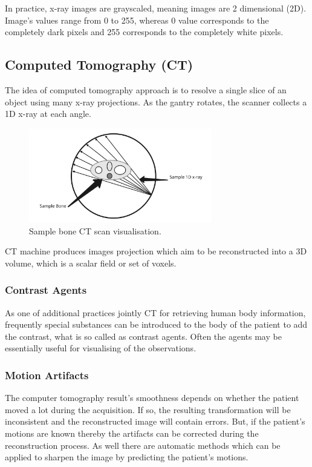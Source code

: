 In practice, x-ray images are grayscaled, meaning images are 2 dimensional (2D). Image's values range from 0 to 255, whereas 0 value corresponds to the completely dark pixels and 255 corresponds to the completely white pixels.


\subsection{Computed Tomography (CT)}
The idea of computed tomography approach is to resolve a single slice of an object using many x-ray projections. As the gantry rotates, the scanner collects a 1D x-ray at each angle.

\begin{figure}[h]
    \centering \includegraphics[width=8cm]{images/ct-scan-sample.jpeg}
    \caption {Sample bone CT scan visualisation.}
\end{figure}

CT machine produces images projection which aim to be reconstructed into a 3D volume, which is a scalar field or set of voxels. 

\subsubsection{Contrast Agents}
As one of additional practices jointly CT for retrieving human body information, frequently special substances can be introduced to the body of the patient to add the contrast, what is so called as contrast agents. Often the agents may be essentially useful for visualising of the observations.          

\subsubsection{Motion Artifacts}
The computer tomography result's smoothness depends on whether the patient moved a lot during the acquisition. If so, the resulting transformation will be inconsistent and the reconstructed image will contain errors. But, if the patient's motions are known thereby the artifacts can be corrected during the reconstruction process. As well there are automatic methods which can be applied to sharpen the image by predicting the patient's motions.

